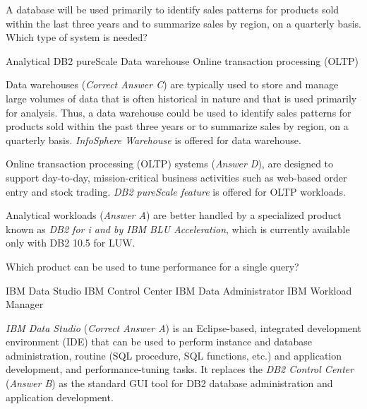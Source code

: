 \documentclass[answers, 11pt]{exam}
\begin{document}
\begin{questions}


\addpoints
\question[1]
A database will be used primarily to identify sales patterns
for products sold within the last three years and to summarize
sales by region, on a quarterly basis. Which type of system is 
needed?
\begin{choices}
\choice Analytical
\choice DB2 pureScale
\CorrectChoice Data warehouse
\choice Online transaction processing (OLTP)
\end{choices}

\begin{solution}
Data warehouses (\textit{Correct Answer C}) are typically used to store and manage large volumes of data that is often
historical in nature and that is used primarily for analysis. Thus, a data warehouse could be used to identify sales patterns
for products sold within the past three years or to summarize sales by region, on a quarterly basis. \textit{InfoSphere Warehouse} is offered for data warehouse.
\par

Online transaction processing (OLTP) systems (\textit{Answer D}), are designed to support day-to-day, mission-critical business
activities such as web-based order entry and stock trading. \textit{DB2 pureScale feature} is offered for OLTP workloads. 
\par

Analytical workloads (\textit{Answer A}) are better handled by a specialized product
known as \textit{DB2 for i and by IBM BLU Acceleration}, which is currently available
only with DB2 10.5 for LUW.

\end{solution}

\question[1]
Which product can be used to tune performance for a single query?
\begin{choices}
\CorrectChoice IBM Data Studio
\choice IBM Control Center
\choice IBM Data Administrator
\choice IBM Workload Manager
\end{choices}

\begin{solution}
\textit{IBM Data Studio} (\textit{Correct Answer A}) is an Eclipse-based, integrated
development environment (IDE) that can be used to perform instance and database
administration, routine (SQL procedure, SQL functions, etc.) and application
development, and performance-tuning tasks. It replaces the \textit{DB2 Control Center} 
(\textit{Answer B}) as the standard GUI tool for DB2 database administration and
application development.
\par


\end{solution}
\end{questions}
\end{document}
